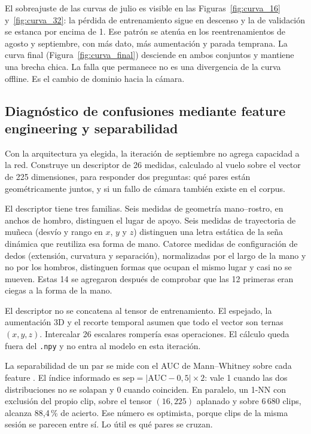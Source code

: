 El sobreajuste de las curvas de julio es visible en las Figuras~\ref{fig:curva_16} y~\ref{fig:curva_32}: la pérdida de entrenamiento sigue en descenso y la de validación se estanca por encima de 1. Ese patrón se atenúa en los reentrenamientos de agosto y septiembre, con más dato, más aumentación y parada temprana. La curva final (Figura~\ref{fig:curva_final}) desciende en ambos conjuntos y mantiene una brecha chica. La falla que permanece no es una divergencia de la curva offline. Es el cambio de dominio hacia la cámara.

\subsection{Diagnóstico de confusiones mediante feature engineering y separabilidad}

Con la arquitectura ya elegida, la iteración de septiembre no agrega capacidad a la red. Construye un descriptor de 26 medidas, calculado al vuelo sobre el vector de 225 dimensiones, para responder dos preguntas: qué pares están geométricamente juntos, y si un fallo de cámara también existe en el corpus.

El descriptor tiene tres familias. Seis medidas de geometría mano--rostro, en anchos de hombro, distinguen el lugar de apoyo. Seis medidas de trayectoria de muñeca (desvío y rango en $x$, $y$ y $z$) distinguen una letra estática de la seña dinámica que reutiliza esa forma de mano. Catorce medidas de configuración de dedos (extensión, curvatura y separación), normalizadas por el largo de la mano y no por los hombros, distinguen formas que ocupan el mismo lugar y casi no se mueven. Estas 14 se agregaron después de comprobar que las 12 primeras eran ciegas a la forma de la mano.

El descriptor no se concatena al tensor de entrenamiento. El espejado, la aumentación 3D y el recorte temporal asumen que todo el vector son ternas $(x, y, z)$. Intercalar 26 escalares rompería esas operaciones. El cálculo queda fuera del \texttt{.npy} y no entra al modelo en esta iteración.

La separabilidad de un par se mide con el AUC de Mann--Whitney sobre cada feature \parencite{mann1947test}. El índice informado es $\mathrm{sep} = \lvert \mathrm{AUC} - 0{,}5 \rvert \times 2$: vale 1 cuando las dos distribuciones no se solapan y 0 cuando coinciden. En paralelo, un 1-NN con exclusión del propio clip, sobre el tensor $(16, 225)$ aplanado y sobre 6\,680 clips, alcanza 88{,}4\,\% de acierto. Ese número es optimista, porque clips de la misma sesión se parecen entre sí. Lo útil es qué pares se cruzan.

